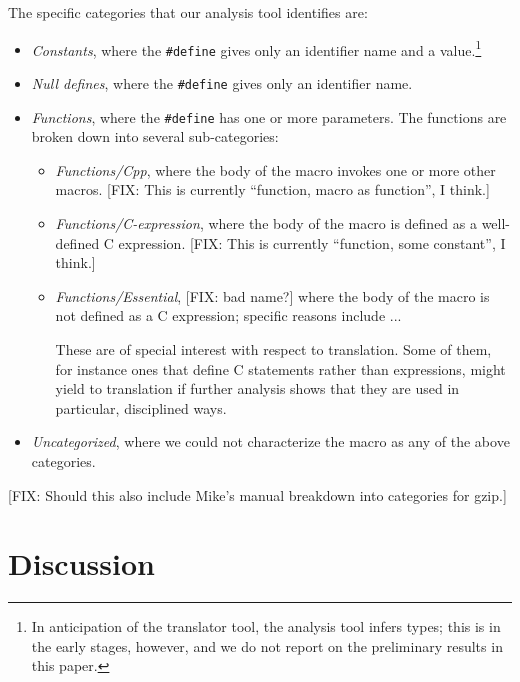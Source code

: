 The specific categories that our analysis tool identifies are:
\begin{itemize}

\item {\em Constants\/}, where the \verb+#define+ gives only an
identifier name and a value.\footnote{In anticipation of the
translator tool, the analysis tool infers types; this is in the early
stages, however, and we do not report on the preliminary results in
this paper.}

\item {\em Null defines\/}, where the \verb+#define+ gives only an
identifier name.

\item {\em Functions\/}, where the \verb+#define+ has one or more
parameters.  The functions are broken down into several sub-categories:
\begin{itemize}

\item {\em Functions/Cpp\/}, where the body of the macro invokes one
or more other macros.  [FIX: This is currently ``function, macro as
function'', I think.]

\item {\em Functions/C-expression\/}, where the body of the macro is
defined as a well-defined C expression.  [FIX: This is currently
``function, some constant'', I think.]

\item {\em Functions/Essential\/}, [FIX: bad name?] where the body of the
macro is not defined as a C expression; specific reasons include
...

These are of special interest with respect to translation.  Some of
them, for instance ones that define C statements rather than
expressions, might yield to translation if further analysis shows that
they are used in particular, disciplined ways.

\end{itemize}

\item {\em Uncategorized\/}, where we could not characterize the macro
as any of the above categories.

\end{itemize}

[FIX: Should this also include Mike's manual breakdown into categories
for gzip.]

\section{Discussion}\label{sec:discussion}

